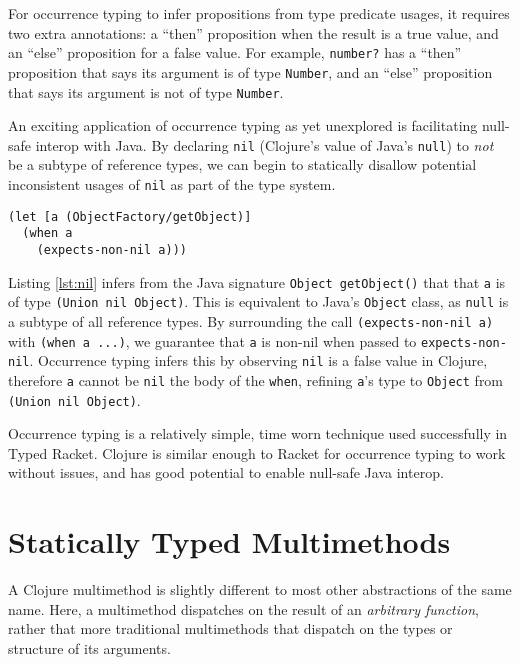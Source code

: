 For occurrence typing to infer propositions from type predicate usages, it requires 
two extra annotations: a ``then'' proposition
when the result is a true value, and an ``else'' proposition for a false value.
For example, \lstinline|number?| has a ``then'' proposition that says its argument
is of type \lstinline|Number|, and an ``else'' proposition that says its argument is not of type \lstinline|Number|.

An exciting application of occurrence typing as yet unexplored is facilitating null-safe interop with Java.
By declaring \lstinline|nil| (Clojure's value of Java's \lstinline|null|) to \emph{not} be a subtype of reference types,
we can begin to statically disallow potential inconsistent usages of \lstinline|nil| as part of the type system.

\begin{lstlisting}[caption=Observing nil-checks using occurrence typing, label=lst:nil]
(let [a (ObjectFactory/getObject)]
  (when a
    (expects-non-nil a)))
\end{lstlisting}

Listing \ref{lst:nil} infers from the Java signature \lstinline|Object getObject()| that
that \lstinline|a| is of type \lstinline|(Union nil Object)|. This is equivalent to Java's
\lstinline|Object| class, as \lstinline|null| is a subtype of all reference types. By surrounding
the call \lstinline|(expects-non-nil a)| with \lstinline|(when a ...)|, we guarantee that
\lstinline|a| is non-nil when passed to \lstinline|expects-non-nil|. Occurrence typing infers
this by observing \lstinline|nil| is a false value in Clojure, therefore \lstinline|a| cannot
be \lstinline|nil| the body of the \lstinline|when|, refining \lstinline|a|'s type to \lstinline|Object|
from \lstinline|(Union nil Object)|.

Occurrence typing is a relatively simple, time worn technique used successfully 
in Typed Racket. Clojure is similar enough to Racket for occurrence typing to work
without issues, and has good potential to enable null-safe Java interop.

\section{Statically Typed Multimethods}

A Clojure multimethod is slightly different to most other
abstractions of the same name. Here, a multimethod 
dispatches on the result of an \emph{arbitrary function},
rather that more traditional multimethods that dispatch on
the types or structure of its arguments.

